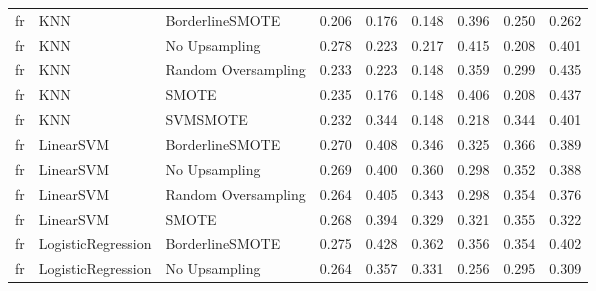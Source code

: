 \begin{tabular}{lllllllll}
      fr &                          KNN &     BorderlineSMOTE & 0.206 &                     0.176 &                 0.148 &                  0.396 &                                   0.250 &     0.262 \\
      fr &                          KNN &       No Upsampling & 0.278 &                     0.223 &                 0.217 &                  0.415 &                                   0.208 &     0.401 \\
      fr &                          KNN & Random Oversampling & 0.233 &                     0.223 &                 0.148 &                  0.359 &                                   0.299 &     0.435 \\
      fr &                          KNN &               SMOTE & 0.235 &                     0.176 &                 0.148 &                  0.406 &                                   0.208 &     0.437 \\
      fr &                          KNN &            SVMSMOTE & 0.232 &                     0.344 &                 0.148 &                  0.218 &                                   0.344 &     0.401 \\
      fr &                    LinearSVM &     BorderlineSMOTE & 0.270 &                     0.408 &                 0.346 &                  0.325 &                                   0.366 &     0.389 \\
      fr &                    LinearSVM &       No Upsampling & 0.269 &                     0.400 &                 0.360 &                  0.298 &                                   0.352 &     0.388 \\
      fr &                    LinearSVM & Random Oversampling & 0.264 &                     0.405 &                 0.343 &                  0.298 &                                   0.354 &     0.376 \\
      fr &                    LinearSVM &               SMOTE & 0.268 &                     0.394 &                 0.329 &                  0.321 &                                   0.355 &     0.322 \\
      fr &           LogisticRegression &     BorderlineSMOTE & 0.275 &                     0.428 &                 0.362 &                  0.356 &                                   0.354 &     0.402 \\
      fr &           LogisticRegression &       No Upsampling & 0.264 &                     0.357 &                 0.331 &                  0.256 &                                   0.295 &     0.309 \\

\end{tabular}
